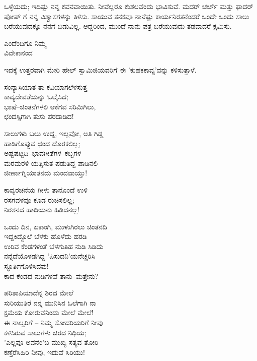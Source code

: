 ಒಳ್ಳೆಯದು; ಇದಿಷ್ಟು ನನ್ನ ಕವನವಾಯಿತು. ನೀವೆಲ್ಲರೂ ಕುಶಲವೆಂದು ಭಾವಿಸುವೆ. ಮದರ್ ಚರ್ಚ್ ಮತ್ತು ಫಾದರ್ ಪೋಪ್ ಗೆ ನನ್ನ ವಿಶ್ವಾಸಗಳನ್ನು ತಿಳಿಸು. ಸಾಯುವ ತನಕವೂ ನಾನೆಷ್ಟು ಕಾರ್ಯನಿರತನೆಂದರೆ ಒಂದೇ ಒಂದು ಸಾಲು ಬರೆಯುವುದಕ್ಕೂ ನನಗೆ ಬಿಡುವಿಲ್ಲ. ಆದ್ದರಿಂದ, ಮುಂದೆ ನಾನು ಪತ್ರ ಬರೆಯುವುದು ತಡವಾದರೆ ಕ್ಷಮಿಸು.

\begin{flushright}
ಎಂದೆಂದಿಗೂ ನಿಮ್ಮ\\ವಿವೇಕಾನಂದ
\end{flushright}

ಇದಕ್ಕೆ ಉತ್ತರವಾಗಿ ಮೇರಿ ಹೇಲ್ ಸ್ವಾಮಿಜಿಯವರಿಗೆ ಈ 'ಕುಹಕಕಾವ್ಯ'ವನ್ನು ಕಳಿಸುತ್ತಾಳೆ.

\begin{myquote}
ಸಂನ್ಯಾಸಿಯಾತ ತಾ ಕವಿಯಾಗಲೆಳಸುತ್ತ\\ಕಾವ್ಯದೇವತೆಯನ್ನು ಓಲೈಸಿದ;\\ಭಾಷೆ–ಚಿಂತನೆಗಳಲಿ ಆಕೆಗವ ಸರಿಮಿಗಿಲು,\\ಛಂದಸ್ಸಿಗಾಗಿ ತುಸು ಪರದಾಡಿದ!
\end{myquote}

\begin{myquote}
ಸಾಲುಗಳು ಬಲು ಉದ್ದ, ಇಲ್ಲವೋ, ಅತಿ ಗಿಡ್ಡ\\ಹಾಡಿಗೊಪ್ಪುವ ಛಂದ ದೊರಕಲಿಲ್ಲ;\\ಅಷ್ಟಷಟ್ಟದಿ–ಭಾವಗೀತೆಗಳ–ಕಬ್ಬಗಳ\\ಮರಮರಳಿ ಯತ್ನಿಸುತ ಪಡುತಿದ್ದ ಪಾಡಿನಲಿ\\ಜೀರ್ಣಾಗ್ನಿಯಾತನದು ಮಂದವಾಯ್ತು!
\end{myquote}

\begin{myquote}
ಕಾವ್ಯರಚನೆಯ ಗೀಳು ತಾನೊಂದೆ ಉಳಿ\\ರಸಗವಳವೂ ಕೂಡ ರುಚಿಸಲಿಲ್ಲ;\\ನಿರಶನದ ಹಾದಿಯನು ಹಿಡಿದನಲ್ಲ!
\end{myquote}

\begin{myquote}
ಒಂದು ದಿನ, ಏಕಾಂಗಿ, ಮುಳುಗಿರಲು ಚಿಂತನದಿ\\ಇದ್ದಕಿದ್ದೊಲೆ ಬೆಳಕು ಹೊಳೆದು ಹರಡಿ\\ಉರಿವ ಕೆಂಡಗಳಂತೆ ಬೆಳಗುತಿಹ ನುಡಿ ಸಿಡಿದು\\ನನ್ನೆದೆಯೊಳಡಗಿದ್ದ 'ಪಿಸುದನಿ'ಯನೆಚ್ಚರಿಸಿ\\ಸ್ಫೂರ್ತಿಗೊಳಿಸಿದವು!\\ಕಾದ ಕೆಂಡದ ನುಡಿಗಳವೆ ತಾನು–ಮತ್ತೇನು?
\end{myquote}

\begin{myquote}
ಪರಿತಾಪಿಯಾದೆನ್ನ ಶಿರದ ಮೇಲೆ\\ಸುರಿಯುತಿರೆ ನನ್ನ ಮುನಿಸಿನ ಓಲೆಗಾಗಿ ನಾ\\ಕ್ಷಮೆಯ ಕೋರುವೆನಿಂದು ಮೇಲೆ ಮೇಲೆ!\\ಈ ನಾಲ್ವರಿಗೆ – ನಿಮ್ಮ ಸೋದರಿಯರಿಗೆ ನೀವು\\ಕಳಿಸಿರುವ ಸಾಲುಗಳು ಚಿರದ ನಿಧಿಯ;\\'ಎಲ್ಲವೂ ಅವನೆಂ'ಬ ಮುಖ್ಯ ಸತ್ಯವ ತೋರಿ\\ಕಣ್ತೆರೆಸಿಹಿರಿ ನೀವು, ಇದುವೆ ಸಿರಿಯು!
\end{myquote}

